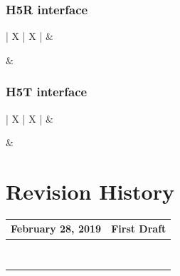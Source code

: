 \documentclass[12pt]{article}
\begin{document}
\subsubsection{H5R interface}

\begin{tabularx}{\linewidth}{| X | X |}
\hline
 &  \\ \hline

& \\ \hline

\end{tabularx}

\subsubsection{H5T interface}

\begin{tabularx}{\linewidth}{| X | X |}
\hline
 &  \\ \hline

& \\ \hline

\end{tabularx}

\newpage

\section{Revision History}

\begin{tabularx}{\linewidth}{| l | X |}
\hline
February 28, 2019 & First Draft \\
\hline
& \\
\hline
& \\
\hline
& \\
\hline
& \\
\hline
& \\
\hline
& \\
\hline
& \\
\hline
& \\
\hline
\end{tabularx}
\end{document}

